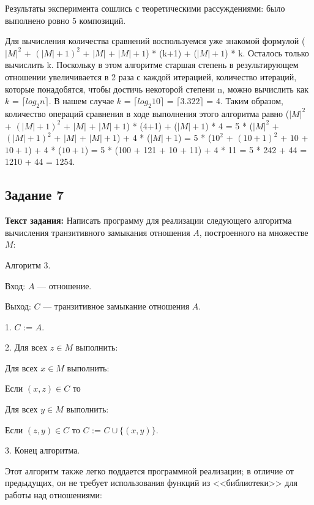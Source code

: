 \documentclass[12pt]{article}
\begin{document}
	Результаты эксперимента сошлись с теоретическими рассуждениями: было выполнено ровно 5 композиций. 
	
	Для вычисления количества сравнений воспользуемся уже знакомой формулой ($|M|^2$ + $(|M|+1)^2$ + $|M|$ + $|M|+1$) * (k+1) + ($|M|+1$) * k. Осталось только вычислить k. Поскольку в этом алгоритме старшая степень в результирующем отношении увеличивается в 2 раза с каждой итерацией, количество итераций, которые понадобятся, чтобы достичь некоторой степени n, можно вычислить как $k$ = $\lceil log_2{n}\rceil$. В нашем случае $k$ = $\lceil log_2{10}\rceil$ = $\lceil3.322\rceil$ = 4. Таким образом, количество операций сравнения в ходе выполнения этого алгоритма равно ($|M|^2$ + $(|M|+1)^2$ + $|M|$ + $|M|+1$) * (4+1) + ($|M|+1$) * 4 = 5 * ($|M|^2$ + $(|M|+1)^2$ + $|M|$ + $|M|+1$) + 4 * ($|M|+1$) = 5 * ($10^2$ + $(10+1)^2$ + $10$ + $10+1$) + 4 * ($10+1$) = 5 * (100 + 121 + 10 + 11) + 4 * 11 = 5 * 242 + 44 = 1210 + 44 = 1254.
	
	\subsection{Задание 7}
	\label{task7}
	{\bf Текст задания:} Написать программу для реализации следующего алгоритма вычисления транзитивного замыкания отношения $A$, построенного на множестве $M$:
	
	{\parskip=0.05cm
	Алгоритм 3.
	
	Вход: $A$ — отношение.
	
	Выход: $C$ — транзитивное замыкание отношения $A$.
	
	1. $C$ := $A$.
	
	2. Для всех $z \in M$ выполнить:
	
	{\hangindent=2cm  \noindent
	Для всех $x \in M$ выполнить:
	
	{\hangindent=3.5cm  \noindent
	Если $(x, z) \in C$ то 
	
	{\hangindent=5cm  \noindent
	Для всех $y \in M$ выполнить:
	
	{\hangindent=6.5cm  \noindent
	Если $(z, y) \in C$ то $C$ := $C \cup \{(x, y)\}$.
	
	3. Конец алгоритма.
	}
	}
	}
	}
	}
	
	Этот алгоритм также легко поддается программной реализации; в отличие от предыдущих, он не требует использования функций из <<библиотеки>> для работы над отношениями:
	 
	
\end{document}
